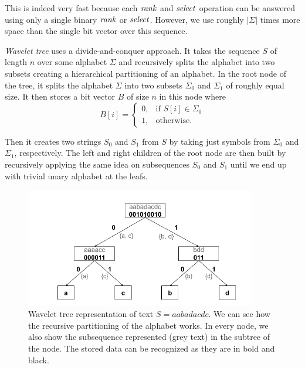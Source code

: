 This is indeed very fast because each $\mathit{rank}$ and $\mathit{select}$ operation can be answered using
only a single binary $\mathit{rank}$ or $\mathit{select}$. However, we use roughly $|\Sigma|$ times more space
than the single bit vector over this sequence.

\textit{Wavelet tree} uses a divide-and-conquer approach. It takes the sequence $S$ of
length $n$ over some alphabet $\Sigma$ and recursively splits the alphabet into
two subsets creating a hierarchical partitioning of an alphabet. In the root node
of the tree, it splits the alphabet $\Sigma$ into two subsets $\Sigma_0$ and $\Sigma_1$
of roughly equal size. It then stores a bit vector $B$ of size $n$ in this node
where
\[
    B[i]= 
\begin{cases}
    0,& \text{if } S[i]\in \Sigma_0\\
    1,              & \text{otherwise.}
\end{cases}
\]

Then it creates two strings $S_0$ and $S_1$ from $S$ by taking just symbols
from $\Sigma_0$ and $\Sigma_1$, respectively. The left and right children of the root node
are then built by recursively applying the same idea on subsequences $S_0$ and $S_1$ until
we end up with trivial unary alphabet at the leafs.

\begin{figure}
	\centerline{
		\includegraphics[width=0.9\textwidth, height=0.3\textheight]{images/wavelet_tree}
	}
	\caption[TODO]{Wavelet tree representation of text $S=\mathit{aabadacdc}$. We can see how
	the recursive partitioning of the alphabet works. In every node, we also show the
	subsequence represented (grey text) in the subtree of the node. The stored data can be
	recognized as they are in bold and black.
	}
	\label{obr:WaveletTreeExample}
\end{figure}


